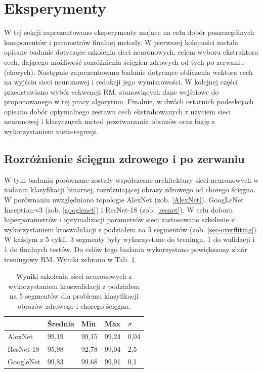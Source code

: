 \section{Eksperymenty}

W tej sekcji zaprezentowano eksperymenty mające na celu dobór poszczególnych komponentów i parametrów finalnej metody. W pierwszej kolejności zostało opisane badanie dotyczące szkolenia sieci neuronowych, celem wyboru ekstraktora cech, dającego możliwość rozróżnienia ścięgien zdrowych od tych po zerwaniu (chorych). Następnie zaprezentowano badanie dotyczące obliczenia wektora cech na wyjściu sieci neuronowej i redukcji jego wymiarowości. W kolejnej części przedstawiono wybór sekwencji RM, stanowiących dane wejściowe do proponowanego w tej pracy algorytmu. Finalnie, w dwóch ostatnich podsekcjach opisano dobór optymalnego zestawu cech ekstrahowanych z użyciem sieci neuronowej i klasycznych metod przetwarzania obrazów oraz fuzję z wykorzystaniem meta-regresji.  


\subsection{Rozróżnienie ścięgna zdrowego i po zerwaniu}
\label{binaryMRI}
W tym badaniu porównane zostały współczesne architektury sieci neuronowych w zadaniu klasyfikacji binarnej, rozróżniającej obrazy zdrowego od chorego ścięgna. W porównaniu uwzględniono topologie AlexNet (zob. \ref{AlexNet}), GoogLeNet Inception-v3 (zob. \ref{googlenet}) i ResNet-18 (zob. \ref{resnet}). W celu doboru hiperparametrów i optymalizacji parametrów sieci zastosowano szkolenie z wykorzystaniem kroswalidacji z podziałem na 5 segmentów (zob. \ref{sec-overffiting}). W każdym z 5 cykli, 3 segmenty były wykorzystane do treningu, 1 do walidacji i 1 do finalnych testów. Do celów tego badania wykorzystano powiększony zbiór treningowy RM. Wyniki zebrano w Tab. \ref{tab:binary-cross-validation}.
\renewcommand{\arraystretch}{1.2}
\begin{table}[h!]
	\setlength{\tabcolsep}{14pt}
	\centering
	\caption{Wyniki szkolenia sieci neuronowych z wykorzystaniem kroswalidacji z podziałem na 5 segmentów dla problemu klasyfikacji obrazów zdrowego i chorego ścięgna.}
	\label{tab:binary-cross-validation}
	\begin{tabular}{l | l | l | l | l }
		 & Średnia & Min   & Max   & $\sigma$   \\ \hline \hline
		AlexNet   & 99,19 & 99,15 & 99,24 & 0,04 \\ \hline
		ResNet-18 & 95,98 & 92,78 & 99,04 & 2,5  \\ \hline
		GoogleNet & 99,83 & 99,68 & 99,91 & 0,1  \\ \hline
	\end{tabular}
\end{table}
\renewcommand{\arraystretch}{1}

